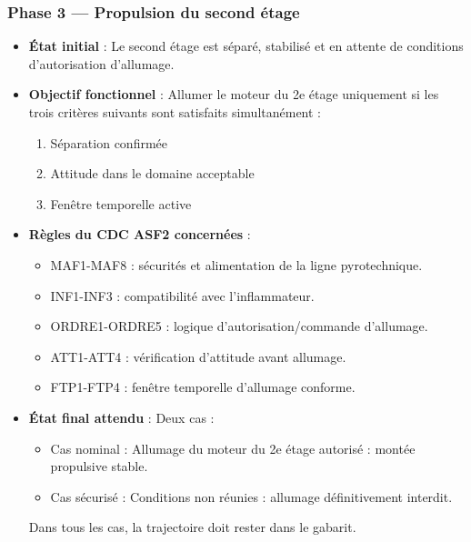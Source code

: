 \subsubsection*{Phase 3 — Propulsion du second étage}
\begin{itemize}
    \item \textbf{État initial} : Le second étage est séparé, stabilisé et en attente de conditions d’autorisation d’allumage.
    \item \textbf{Objectif fonctionnel} : Allumer le moteur du 2e étage uniquement si les trois critères suivants sont
    satisfaits simultanément :
    \begin{enumerate}
        \item Séparation confirmée
        \item Attitude dans le domaine acceptable
        \item Fenêtre temporelle active
    \end{enumerate}
    \item \textbf{Règles du \acrshort{CDC} ASF2 concernées} :
    \begin{itemize}
        \item MAF1-MAF8\cite[p. ~68-70]{CDC_BiEtage} : sécurités et alimentation de la ligne pyrotechnique.
        \item INF1-INF3\cite[p. ~73-75]{CDC_BiEtage} : compatibilité avec l’inflammateur.
        \item ORDRE1-ORDRE5\cite[p. ~78-80]{CDC_BiEtage} : logique d’autorisation/commande d’allumage.
        \item ATT1-ATT4\cite[p. ~81-83]{CDC_BiEtage} : vérification d’attitude avant allumage.
        \item FTP1-FTP4\cite[p. ~84-86]{CDC_BiEtage} : fenêtre temporelle d’allumage conforme.
    \end{itemize}
    \item \textbf{État final attendu} : Deux cas :
    \begin{itemize}
        \item Cas nominal : Allumage du moteur du 2e étage autorisé : montée propulsive stable.
        \item Cas sécurisé : Conditions non réunies : allumage définitivement interdit.
    \end{itemize}
    Dans tous les cas, la trajectoire doit rester dans le gabarit.
\end{itemize}


